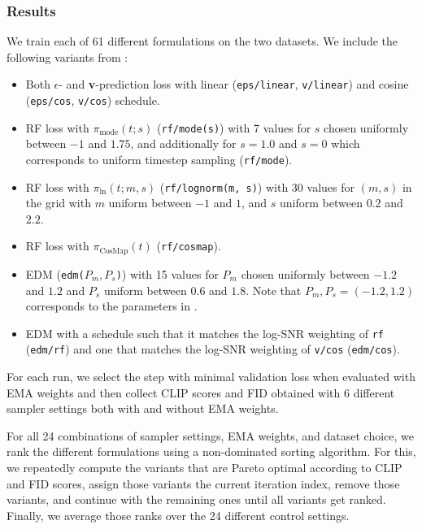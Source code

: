 \subsubsection{Results}
We train each of 61 different formulations on the two datasets. We include the
following variants from :
\begin{itemize}[noitemsep,topsep=0pt,parsep=0pt,partopsep=0pt]
  \item Both $\epsilon$- and \textbf{v}-prediction loss with linear
    (\texttt{eps/linear}, \texttt{v/linear}) and cosine
    (\texttt{eps/cos}, \texttt{v/cos}) schedule.
  \item RF loss with $\pi_{\text{mode}}(t; s)$ (\texttt{rf/mode(s)}) with 7 values for $s$ chosen
    uniformly between $-1$ and $1.75$, and additionally for $s=1.0$ and $s=0$ which
    corresponds to uniform timestep sampling (\texttt{rf/mode}).
  \item RF loss with $\pi_{\text{ln}}(t; m, s)$ (\texttt{rf/lognorm(m, s)})
    with 30 values for $(m, s)$ in the grid with $m$ uniform between $-1$ and
    $1$, and $s$ uniform between $0.2$ and $2.2$.
  \item RF loss with $\pi_{\text{CosMap}}(t)$ (\texttt{rf/cosmap}).
  \item EDM (\texttt{edm($P_m, P_s$)}) with 15 values for $P_m$ chosen
    uniformly between $-1.2$ and $1.2$ and $P_s$ uniform between $0.6$ and
    $1.8$. Note that $P_m, P_s=(-1.2, 1.2)$ corresponds to the parameters
    in \cite{Karras2022ElucidatingTD}.
  \item EDM with a schedule such that it matches the log-SNR weighting of
    \texttt{rf} (\texttt{edm/rf}) and one that matches the log-SNR weighting of
    \texttt{v/cos} (\texttt{edm/cos}).
\end{itemize}

For each run, we select the step with minimal validation loss when evaluated with EMA weights and then collect CLIP scores and FID obtained with 6 different
sampler settings both with and without EMA weights.

For all 24 combinations of sampler settings, EMA weights, and dataset choice, we
rank the different formulations using a non-dominated sorting algorithm. For
this, we repeatedly compute the variants that are Pareto optimal according to
CLIP and FID scores, assign those variants the current iteration index, remove
those variants, and continue with the remaining ones until all variants get
ranked. Finally, we average those ranks over the 24 different control settings.

